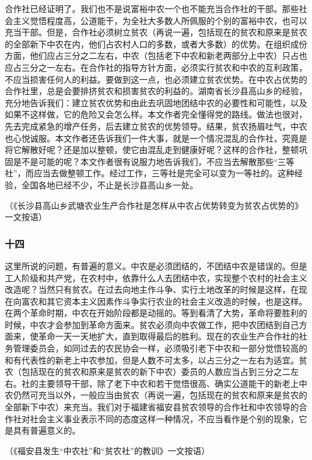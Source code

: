 \documentclass[cn,11pt,chinese]{elegantbook}
\def\myformat#1{\hfil\hfil #1}
\begin{document}
合作社已经证明了。我们也不是说富裕中农一个也不能充当合作社的干部。那些社会主义觉悟程度高，公道能干，为全社大多数人所佩服的个别的富裕中农，也可以充当干部。但是，合作社必须树立贫农（再说一遍，包括现在的贫农和原来是贫农的全部新下中农在内，他们占农村人口的多数，或者大多数）的优势。在组织成份方面，他们应占三分之二左右，中农（包括老下中农和新老两部分上中农）只占也应占三分之一左右。在合作社的指导方针方面，必须实行贫农和中农的互利政策，不应当损害任何人的利益。要做到这一点，也必须建立贫农优势。在中农占优势的合作社里，总是会要排挤贫农和损害贫农的利益的。湖南省长沙县高山乡的经验，充分地告诉我们：建立贫农优势和由此去巩固地团结中农的必要性和可能性，以及如果不这样做，它的危险又会怎么样。本文作者完全懂得党的路线。做法也很对，先去完成紧急的增产任务，后去建立贫农的优势领导。结果，贫农扬眉吐气，中农也心悦诚服。本文作者还告诉我们一件大事，就是一个情况混乱的合作社，究竟是将它解散好呢？还是加以整顿，使它由混乱走到健康好呢？这样的合作社，整顿巩固是不是可能的呢？本文作者很有说服力地告诉我们，不应当去解散那些“三等社”，而应当去做整顿工作。经过工作，三等社是完全可以变为一等社的。这种经验，全国各地已经不少，不止是长沙县高山乡一处。\\
\begin{flushright}（《长沙县高山乡武塘农业生产合作社是怎样从中农占优势转变为贫农占优势的》一文按语）\end{flushright}
\subsubsection*{\myformat{十四}}
这里所说的问题，有普遍的意义。中农是必须团结的，不团结中农是错误的。但是工人阶级和共产党，在农村中，依靠什么人去团结中农，实现整个农村的社会主义改造呢？当然只有贫农。在过去向地主作斗争、实行土地改革的时候是这样，在现在向富农和其它资本主义因素作斗争实行农业的社会主义改造的时候，也是这样。在两个革命时期，中农在开始阶段都是动摇的。等到看清了大势，革命将要胜利的时候，中农才会参加到革命方面来。贫农必须向中农做工作，把中农团结到自己方面来，使革命一天一天地扩大，直到取得最后的胜利。现在的农业生产合作社的社务管理委员会，如同过去的农民协会一样，必须吸引老下中农和一部分觉悟较高的和有代表性的新老上中农参加，但是人数不可太多，以占三分之一左右为适宜。贫农（包括现在的贫农和原来是贫农的新下中农）委员的人数应当占到三分之二左右。社的主要领导干部，除了老下中农和若干觉悟很高、确实公道能干的新老上中农仍然可充当以外，一般应当由贫农（再说一遍，包括现在的贫农和原来是贫农的全部新下中农）来充当。我们对于福建省福安县贫农领导的合作社和中农领导的合作社对社会主义事业表示不同的态度这样一种情况，不应当看作是个别的现象，它是具有普遍意义的。\\
\begin{flushright}（《福安县发生“中农社”和“贫农社”的教训》一文按语）\end{flushright}
\end{document}
